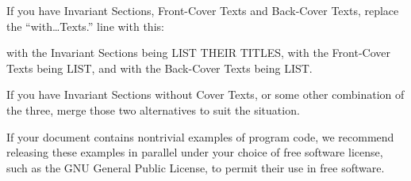 If you have Invariant Sections, Front-Cover Texts and
Back-Cover Texts, replace the “with…Texts.” line
with this:


\begin{myindentpara}{2cm}
with the Invariant Sections being LIST THEIR TITLES, with
the Front-Cover Texts being LIST, and with the Back-Cover Texts
being LIST.
\end{myindentpara}

If you have Invariant Sections without Cover Texts, or some
other combination of the three, merge those two alternatives
to suit the situation.

If your document contains nontrivial examples of program code,
we recommend releasing these examples in parallel under your
choice of free software license, such as the GNU General
Public License, to permit their use in free software.

